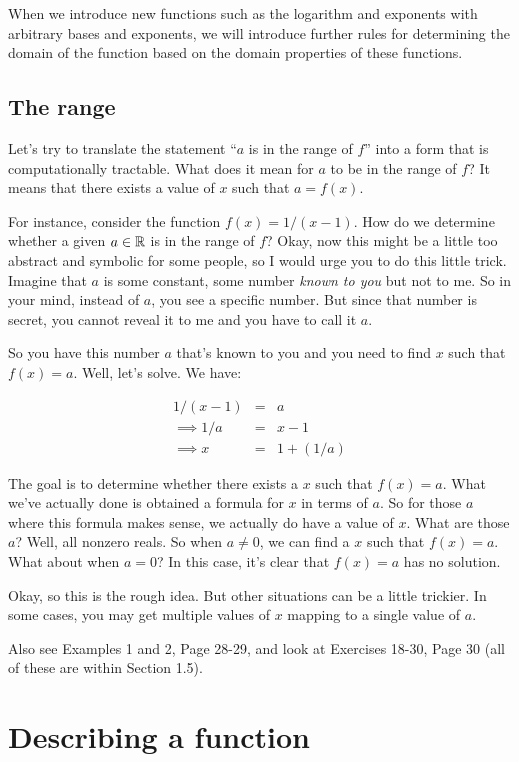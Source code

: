 \documentclass{amsart}
\begin{document}
When we introduce new functions such as the logarithm and exponents
with arbitrary bases and exponents, we will introduce further rules
for determining the domain of the function based on the domain
properties of these functions.

\subsection{The range}

Let's try to translate the statement ``$a$ is in the range of $f$''
into a form that is computationally tractable. What does it mean
for $a$ to be in the range of $f$? It means that there exists a value
of $x$ such that $a = f(x)$.

For instance, consider the function $f(x) = 1/(x-1)$. How do we
determine whether a given $a \in \mathbb{R}$ is in the range of $f$? Okay, now
this might be a little too abstract and symbolic for some people, so I
would urge you to do this little trick. Imagine that $a$ is some
constant, some number {\em known to you} but not to me. So in your
mind, instead of $a$, you see a specific number. But since that number
is secret, you cannot reveal it to me and you have to call it $a$.

So you have this number $a$ that's known to you and you need to find
$x$ such that $f(x) = a$. Well, let's solve. We have:

\begin{eqnarray*}
  1/(x-1) & = &a \\
  \implies 1/a & = & x - 1 \\
  \implies x & = & 1 + (1/a)
\end{eqnarray*}

The goal is to determine whether there exists a $x$ such that $f(x) =
a$. What we've actually done is obtained a formula for $x$ in terms of
$a$. So for those $a$ where this formula makes sense, we actually do
have a value of $x$. What are those $a$? Well, all nonzero reals. So
when $a \ne 0$, we can find a $x$ such that $f(x) = a$. What about
when $a = 0$? In this case, it's clear that $f(x) = a$ has no
solution.

Okay, so this is the rough idea. But other situations can be a little
trickier. In some cases, you may get multiple values of $x$ mapping to
a single value of $a$.

Also see Examples 1 and 2, Page 28-29, and look at Exercises 18-30,
Page 30 (all of these are within Section 1.5).

\section{Describing a function}
\end{document}
